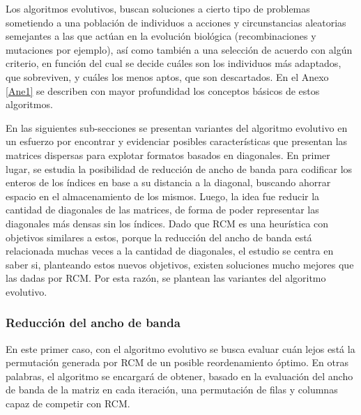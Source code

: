 Los algoritmos evolutivos, buscan soluciones a cierto tipo de problemas sometiendo a una población de individuos a acciones y circunstancias aleatorias semejantes a las que actúan en la evolución biológica (recombinaciones y mutaciones por ejemplo), así como también a una selección de acuerdo con algún criterio, en función del cual se decide cuáles son los individuos más adaptados, que sobreviven, y cuáles los menos aptos, que son descartados. En el Anexo \ref{Ane1} se describen con mayor profundidad los conceptos básicos de estos algoritmos.

En las siguientes sub-secciones se presentan variantes del algoritmo evolutivo en un esfuerzo por encontrar y evidenciar posibles características que presentan las matrices dispersas para explotar formatos basados en diagonales.
En primer lugar, se estudia la posibilidad de reducción de ancho de banda para codificar los enteros de los índices en base a su distancia a la diagonal, buscando ahorrar espacio en el almacenamiento de los mismos. Luego, la idea fue reducir la cantidad de diagonales de las matrices, de forma de poder representar las diagonales más densas sin los índices. Dado que RCM es una heurística con objetivos similares a  estos, porque la reducción del ancho de banda está relacionada muchas veces a la cantidad de diagonales, el estudio se centra en saber si, planteando estos nuevos objetivos, existen soluciones mucho mejores que las dadas por RCM. Por esta razón, se plantean las variantes del algoritmo evolutivo.


\subsubsection{Reducción del ancho de banda}\label{sec:band-reduction-ag}

En este primer caso, con el algoritmo evolutivo se busca evaluar cuán lejos está la permutación generada por RCM de un posible reordenamiento óptimo. En otras palabras, el algoritmo se encargará de obtener, basado en la evaluación del ancho de banda de la matriz en cada iteración, una permutación de filas y columnas capaz de competir con RCM.


